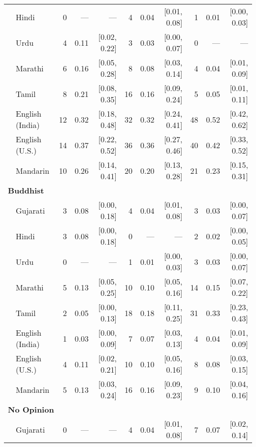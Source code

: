 \begin{table}[t]
\begin{footnotesize}
\begin{tabular}{p{.1in}lrrrrrrrrr}
 & Hindi & 0 & --- & --- & 4 & 0.04 & [0.01, 0.08] & 1 & 0.01 & [0.00, 0.03]\\

 & Urdu & 4 & 0.11 & [0.02, 0.22] & 3 & 0.03 & [0.00, 0.07] & 0 & --- & ---\\

 & Marathi & 6 & 0.16 & [0.05, 0.28] & 8 & 0.08 & [0.03, 0.14] & 4 & 0.04 & [0.01, 0.09]\\

 & Tamil & 8 & 0.21 & [0.08, 0.35] & 16 & 0.16 & [0.09, 0.24] & 5 & 0.05 & [0.01, 0.11]\\

 & English (India) & 12 & 0.32 & [0.18, 0.48] & 32 & 0.32 & [0.24, 0.41] & 48 & 0.52 & [0.42, 0.62]\\

 & English (U.S.) & 14 & 0.37 & [0.22, 0.52] & 36 & 0.36 & [0.27, 0.46] & 40 & 0.42 & [0.33, 0.52]\\
& Mandarin & 10 & 0.26 & [0.14, 0.41] & 20 & 0.20 & [0.13, 0.28] & 21 & 0.23 & [0.15, 0.31]\\
 \midrule
\multicolumn{11}{l}{\textbf{Buddhist}}\\
& Gujarati & 3 & 0.08 & [0.00, 0.18] & 4 & 0.04 & [0.01, 0.08] & 3 & 0.03 & [0.00, 0.07]\\

 & Hindi & 3 & 0.08 & [0.00, 0.18] & 0 & --- & --- & 2 & 0.02 & [0.00, 0.05]\\

 & Urdu & 0 & --- & --- & 1 & 0.01 & [0.00, 0.03] & 3 & 0.03 & [0.00, 0.07]\\

 & Marathi & 5 & 0.13 & [0.05, 0.25] & 10 & 0.10 & [0.05, 0.16] & 14 & 0.15 & [0.07, 0.22]\\

 & Tamil & 2 & 0.05 & [0.00, 0.13] & 18 & 0.18 & [0.11, 0.25] & 31 & 0.33 & [0.23, 0.43]\\

 & English (India) & 1 & 0.03 & [0.00, 0.09] & 7 & 0.07 & [0.03, 0.13] & 4 & 0.04 & [0.01, 0.09]\\

 & English (U.S.) & 4 & 0.11 & [0.02, 0.21] & 10 & 0.10 & [0.05, 0.16] & 8 & 0.08 & [0.03, 0.15]\\

& Mandarin & 5 & 0.13 & [0.03, 0.24] & 16 & 0.16 & [0.09, 0.23] & 9 & 0.10 & [0.04, 0.16]\\
 \midrule
\multicolumn{11}{l}{\textbf{No Opinion}}\\
& Gujarati & 0 & --- & --- & 4 & 0.04 & [0.01, 0.08] & 7 & 0.07 & [0.02, 0.14]\\


\end{tabular}
\end{footnotesize}
\end{table}
